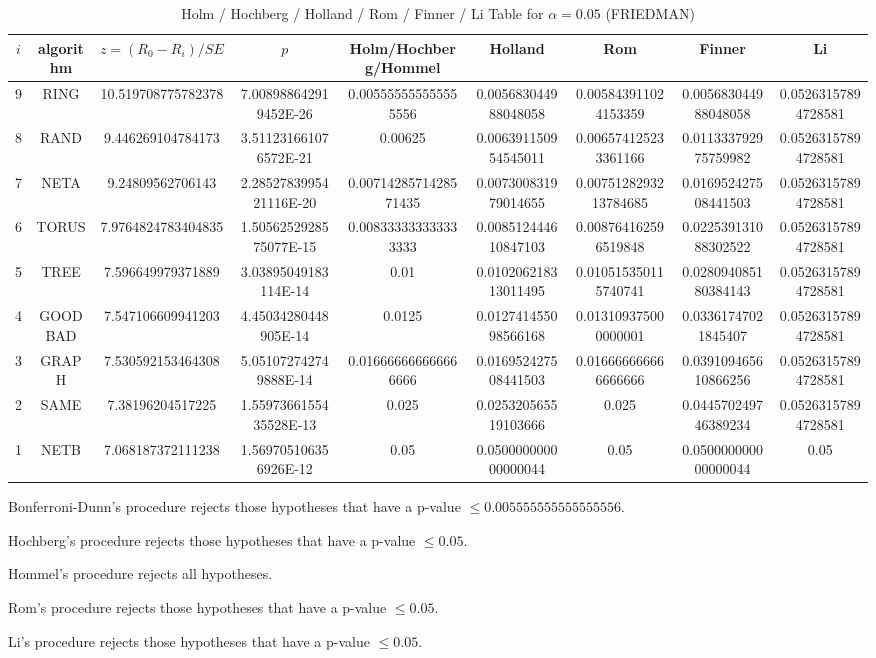 \documentclass[a4paper,10pt]{article}
\begin{document}
\begin{landscape}
\begin{table}[!htp]
\centering\scriptsize
\caption{Holm / Hochberg / Holland / Rom / Finner / Li Table for $\alpha=0.05$ (FRIEDMAN)}
\begin{tabular}{ccccccccc}
$i$&algorithm&$z=(R_0 - R_i)/SE$&$p$&Holm/Hochberg/Hommel&Holland&Rom&Finner&Li\\
\hline
9& RING&10.519708775782378&7.008988642919452E-26&0.005555555555555556&0.005683044988048058&0.005843911024153359&0.005683044988048058&0.05263157894728581\\
8& RAND&9.446269104784173&3.511231661076572E-21&0.00625&0.006391150954545011&0.006574125233361166&0.011333792975759982&0.05263157894728581\\
7& NETA&9.24809562706143&2.2852783995421116E-20&0.0071428571428571435&0.007300831979014655&0.0075128293213784685&0.016952427508441503&0.05263157894728581\\
6& TORUS&7.9764824783404835&1.5056252928575077E-15&0.008333333333333333&0.008512444610847103&0.008764162596519848&0.022539131088302522&0.05263157894728581\\
5& TREE&7.596649979371889&3.03895049183114E-14&0.01&0.010206218313011495&0.010515350115740741&0.028094085180384143&0.05263157894728581\\
4& GOODBAD&7.547106609941203&4.45034280448905E-14&0.0125&0.012741455098566168&0.013109375000000001&0.03361747021845407&0.05263157894728581\\
3& GRAPH&7.530592153464308&5.051072742749888E-14&0.016666666666666666&0.016952427508441503&0.016666666666666666&0.039109465610866256&0.05263157894728581\\
2& SAME&7.38196204517225&1.5597366155435528E-13&0.025&0.025320565519103666&0.025&0.044570249746389234&0.05263157894728581\\
1& NETB&7.068187372111238&1.569705106356926E-12&0.05&0.050000000000000044&0.05&0.050000000000000044&0.05\\
\hline
\end{tabular}
\end{table}
Bonferroni-Dunn's procedure rejects those hypotheses that have a p-value $\le0.005555555555555556$.


Hochberg's procedure rejects those hypotheses that have a p-value $\le0.05$.


Hommel's procedure rejects all hypotheses.


Rom's procedure rejects those hypotheses that have a p-value $\le0.05$.


Li's procedure rejects those hypotheses that have a p-value $\le0.05$.




\end{landscape}
\end{document}
